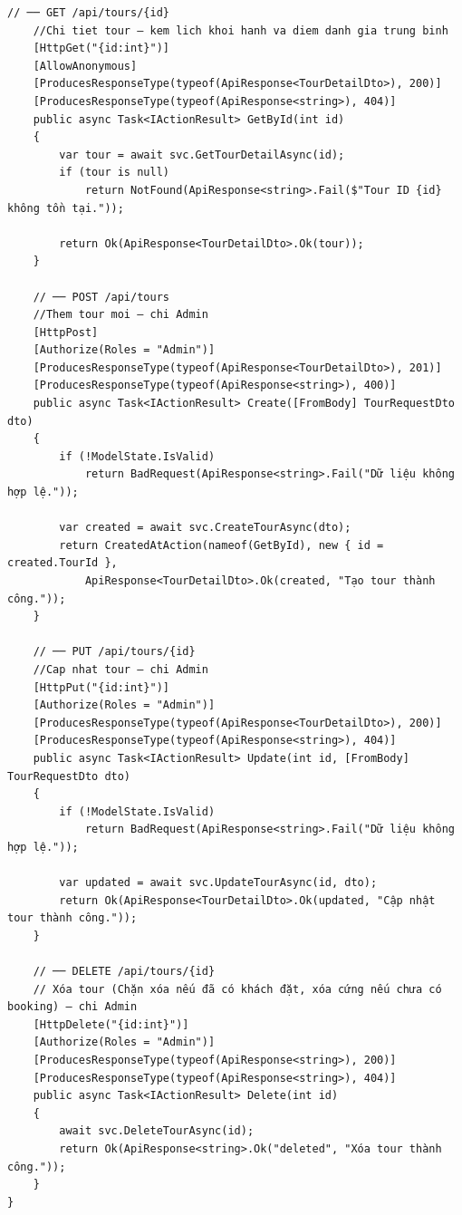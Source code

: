 \begin{lstlisting}[style=csharp, caption={ToursController --- các action chính}]
    // ── GET /api/tours/{id}
    //Chi tiet tour — kem lich khoi hanh va diem danh gia trung binh
    [HttpGet("{id:int}")]
    [AllowAnonymous]
    [ProducesResponseType(typeof(ApiResponse<TourDetailDto>), 200)]
    [ProducesResponseType(typeof(ApiResponse<string>), 404)]
    public async Task<IActionResult> GetById(int id)
    {
        var tour = await svc.GetTourDetailAsync(id);
        if (tour is null)
            return NotFound(ApiResponse<string>.Fail($"Tour ID {id} không tồn tại."));

        return Ok(ApiResponse<TourDetailDto>.Ok(tour));
    }

    // ── POST /api/tours
    //Them tour moi — chi Admin
    [HttpPost]
    [Authorize(Roles = "Admin")]
    [ProducesResponseType(typeof(ApiResponse<TourDetailDto>), 201)]
    [ProducesResponseType(typeof(ApiResponse<string>), 400)]
    public async Task<IActionResult> Create([FromBody] TourRequestDto dto)
    {
        if (!ModelState.IsValid)
            return BadRequest(ApiResponse<string>.Fail("Dữ liệu không hợp lệ."));

        var created = await svc.CreateTourAsync(dto);
        return CreatedAtAction(nameof(GetById), new { id = created.TourId },
            ApiResponse<TourDetailDto>.Ok(created, "Tạo tour thành công."));
    }

    // ── PUT /api/tours/{id}
    //Cap nhat tour — chi Admin
    [HttpPut("{id:int}")]
    [Authorize(Roles = "Admin")]
    [ProducesResponseType(typeof(ApiResponse<TourDetailDto>), 200)]
    [ProducesResponseType(typeof(ApiResponse<string>), 404)]
    public async Task<IActionResult> Update(int id, [FromBody] TourRequestDto dto)
    {
        if (!ModelState.IsValid)
            return BadRequest(ApiResponse<string>.Fail("Dữ liệu không hợp lệ."));

        var updated = await svc.UpdateTourAsync(id, dto);
        return Ok(ApiResponse<TourDetailDto>.Ok(updated, "Cập nhật tour thành công."));
    }

    // ── DELETE /api/tours/{id}
    // Xóa tour (Chặn xóa nếu đã có khách đặt, xóa cứng nếu chưa có booking) — chi Admin
    [HttpDelete("{id:int}")]
    [Authorize(Roles = "Admin")]
    [ProducesResponseType(typeof(ApiResponse<string>), 200)]
    [ProducesResponseType(typeof(ApiResponse<string>), 404)]
    public async Task<IActionResult> Delete(int id)
    {
        await svc.DeleteTourAsync(id);
        return Ok(ApiResponse<string>.Ok("deleted", "Xóa tour thành công."));
    }
}
\end{lstlisting}

